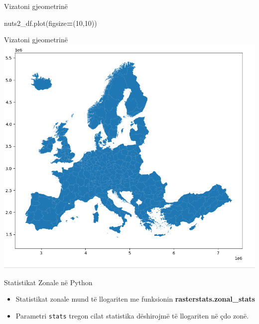 \documentclass[
  ignorenonframetext,
]{beamer}
\newenvironment{Shaded}{\begin{snugshade}}{\end{snugshade}}
\newcommand{\DecValTok}[1]{\textcolor[rgb]{0.00,0.00,0.81}{#1}}
\newcommand{\NormalTok}[1]{#1}
\newcommand{\OperatorTok}[1]{\textcolor[rgb]{0.81,0.36,0.00}{\textbf{#1}}}
\begin{document}
\begin{frame}[fragile]{Vizatoni gjeometrinë}
\protect\hypertarget{vizatoni-gjeometrinuxeb}{}

\begin{Shaded}
\begin{Highlighting}[]
\NormalTok{nuts2\_df.plot(figsize}\OperatorTok{=}\NormalTok{(}\DecValTok{10}\NormalTok{,}\DecValTok{10}\NormalTok{))}
\end{Highlighting}
\end{Shaded}
\end{frame}

\begin{frame}{Vizatoni gjeometrinë}
\protect\hypertarget{vizatoni-gjeometrinuxeb-1}{}
\includegraphics{./Figs/algebra1.png}
\end{frame}

\begin{frame}[fragile]{Statistikat Zonale në Python}
\protect\hypertarget{statistikat-zonale-nuxeb-python}{}
\begin{itemize}
\item
  Statistikat zonale mund të llogariten me funksionin
  \textbf{rasterstats.zonal\_stats}
\item
  Parametri \texttt{stats} tregon cilat statistika dëshirojmë të
  llogariten në çdo zonë.
\end{itemize}
\end{frame}
\end{document}

